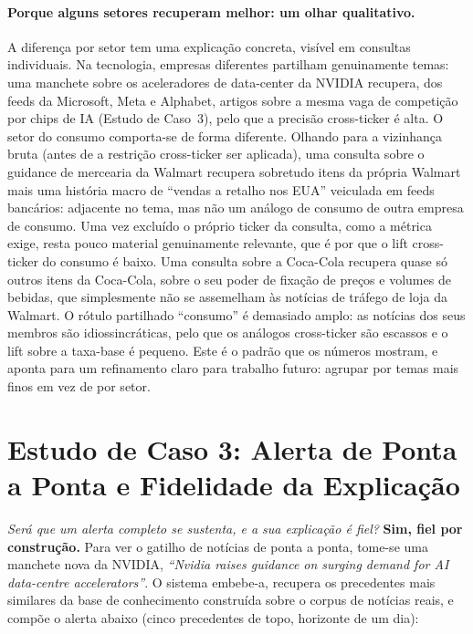 \paragraph{Porque alguns setores recuperam melhor: um olhar qualitativo.}
A diferença por setor tem uma explicação concreta, visível em consultas individuais. Na tecnologia, empresas
diferentes partilham genuinamente temas: uma manchete sobre os aceleradores de data-center da NVIDIA recupera,
dos feeds da Microsoft, Meta e Alphabet, artigos sobre a mesma vaga de competição por chips de IA (Estudo de
Caso~3), pelo que a precisão cross-ticker é alta. O setor do consumo comporta-se de forma diferente. Olhando
para a vizinhança bruta (antes de a restrição cross-ticker ser aplicada), uma consulta sobre o guidance de
mercearia da Walmart recupera sobretudo itens da própria Walmart mais uma história macro de ``vendas a retalho
nos EUA'' veiculada em feeds bancários: adjacente no tema, mas não um análogo de consumo de outra empresa de
consumo. Uma vez excluído o próprio ticker da consulta, como a métrica exige, resta pouco material genuinamente
relevante, que é por que o lift cross-ticker do consumo é baixo. Uma consulta sobre a Coca-Cola recupera quase
só outros itens da Coca-Cola, sobre o seu poder de fixação de preços e volumes de bebidas, que simplesmente não
se assemelham às notícias de tráfego de loja da Walmart. O rótulo partilhado ``consumo'' é demasiado amplo: as
notícias dos seus membros são idiossincráticas, pelo que os análogos cross-ticker são escassos e o lift sobre a
taxa-base é pequeno. Este é o padrão que os números mostram, e aponta para um refinamento claro para trabalho
futuro: agrupar por temas mais finos em vez de por setor.

\section{Estudo de Caso 3: Alerta de Ponta a Ponta e Fidelidade da Explicação}
\label{sec:cs_endtoend}

\emph{Será que um alerta completo se sustenta, e a sua explicação é fiel?} \textbf{Sim, fiel por construção.}
Para ver o gatilho de notícias de ponta a ponta, tome-se uma manchete nova da NVIDIA, \emph{``Nvidia raises
guidance on surging demand for AI data-centre accelerators''}. O sistema embebe-a, recupera os precedentes mais
similares da base de conhecimento construída sobre o corpus de notícias reais, e compõe o alerta abaixo (cinco
precedentes de topo, horizonte de um dia):

